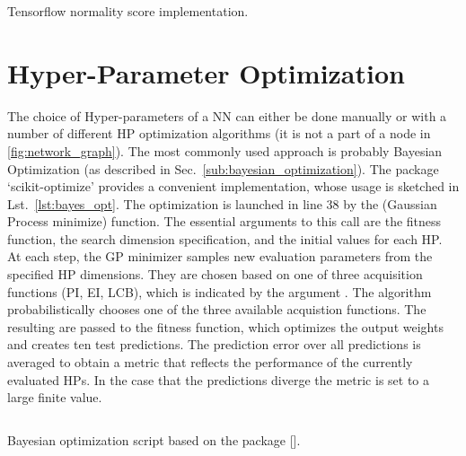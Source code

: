 \begin{listing}
  \inputminted{py}{pseudocode/score.py}
  \caption{Tensorflow normality score implementation.}
  \label{lst:score}
\end{listing}


\section{Hyper-Parameter Optimization}%
\label{sec:impl_hyper_parameter_optimization}

The choice of Hyper-parameters of a NN can either be done manually or with a
number of different HP optimization algorithms (it is not a part of a node in
\ref{fig:network_graph}). The most commonly used approach is probably Bayesian
Optimization (as described in Sec.~\ref{sub:bayesian_optimization}).  The
package `scikit-optimize' provides a convenient implementation, whose usage is
sketched in Lst.~\ref{lst:bayes_opt}.  The optimization is launched in line 38
by the  (Gaussian Process minimize) function. The
essential arguments to this call are the fitness function, the search dimension
specification, and the initial values for each HP.  At each step, the GP
minimizer samples new evaluation parameters from the specified HP dimensions.
They are chosen based on one of three acquisition functions (PI, EI, LCB),
which is indicated by the argument . The algorithm
probabilistically chooses one of the three available acquistion functions.  The
resulting  are passed to the fitness function, which
optimizes the output weights and creates ten test predictions.  The prediction
error over all predictions is averaged to obtain a metric that reflects the
performance of the currently evaluated HPs. In the case that the predictions
diverge the metric is set to a large finite value.

\begin{listing}
  \inputminted{py}{pseudocode/hparam_opt.py}
  \caption{Bayesian optimization script based on the package [\cite{skopt}].}
  \label{lst:bayes_opt}
\end{listing}
